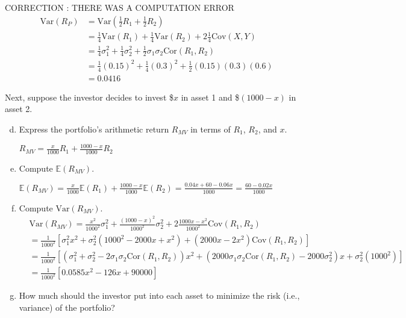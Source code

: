 \documentclass[letterpaper,12pt,fleqn]{article}
\begin{document}
\begin{enumerate}
\begin{enumerate}[a)]
CORRECTION : THERE WAS A COMPUTATION ERROR
\begin{align*}
\mbox{Var}(R_{P}) &= \mbox{Var}(\frac{1}{2} R_{1}+\frac{1}{2} R_{2}) \\
&= \frac{1}{4}\mbox{Var}(R_1) + \frac{1}{4} \mbox{Var} (R_2) + 2\frac{1}{4} \mbox{Cov} (X,Y) \\
&= \frac{1}{4}\sigma_1^2 + \frac{1}{4}\sigma_2^2 + \frac{1}{2} \sigma_1\sigma_2\mbox{Cor}(R_1,R_2) \\
&= \frac{1}{4}(0.15)^2 + \frac{1}{4}(0.3)^2 + \frac{1}{2}(0.15)(0.3)(0.6) \\
&= 0.0416
\end{align*}

\end{enumerate}

\vspace{1em}

Next, suppose the investor decides to invest \$$x$ in asset 1 and \$$(1000 - x)$ in asset 2.


\begin{enumerate}[a)]
\setcounter{enumii}{3}
\item Express the portfolio's arithmetic return $R_{MV}$ in terms of $R_{1}$, $R_{2}$, and $x$.

$R_{MV} = \frac{x}{1000} R_1 + \frac{1000-x}{1000} R_2$

\item Compute $\mathbb{E}(R_{MV})$.

$\mathbb{E}(R_{MV}) = \frac{x}{1000}\mathbb{E}(R_1) + \frac{1000-x}{1000}\mathbb{E}(R_2) = \frac{0.04x + 60-0.06x}{1000} =\frac{60-0.02x}{1000}$

\item Compute $\mbox{Var}(R_{MV})$.
\begin{align*}
&\mbox{Var}(R_{MV}) = \frac{x^2}{1000^2}\sigma_1^2+\frac{(1000-x)^2}{1000^2}\sigma_2^2 + 2\frac{1000x-x^2}{1000^2}\mbox{Cov}(R_1,R_2) \\
&= \frac{1}{1000^2}[\sigma_1^2x^2+\sigma_2^2(1000^2-2000x+x^2) + (2000x-2x^2)\mbox{Cov}(R_1,R_2)] \\
&= \frac{1}{1000^2}[(\sigma_1^2+\sigma_2^2-2\sigma_1\sigma_2\mbox{Cor}(R_1,R_2))x^2 + (2000\sigma_1\sigma_2\mbox{Cor}(R_1,R_2) - 2000\sigma_2^2)x + \sigma_2^2(1000^2)] \\
&= \frac{1}{1000^2}[0.0585x^2 -126x + 90000]
\end{align*}

\item How much should the investor put into each asset to minimize the risk (i.e., variance) of the portfolio?
\end{enumerate}


\end{enumerate}
\end{document}
